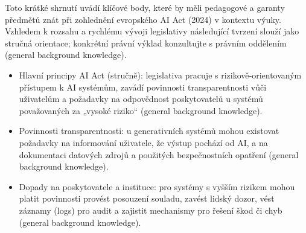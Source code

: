 Toto krátké shrnutí uvádí klíčové body, které by měli pedagogové a garanty předmětů znát při zohlednění evropského AI Act (2024) v kontextu výuky. Vzhledem k rozsahu a rychlému vývoji legislativy následující tvrzení slouží jako stručná orientace; konkrétní právní výklad konzultujte s právním oddělením (general background knowledge).

\begin{itemize}
  \item Hlavní principy AI Act (stručně): legislativa pracuje s rizikově‑orientovaným přístupem k AI systémům, zavádí povinnosti transparentnosti vůči uživatelům a požadavky na odpovědnost poskytovatelů u systémů považovaných za „vysoké riziko“ (general background knowledge).
  \item Povinnosti transparentnosti: u generativních systémů mohou existovat požadavky na informování uživatele, že výstup pochází od AI, a na dokumentaci datových zdrojů a použitých bezpečnostních opatření (general background knowledge).
  \item Dopady na poskytovatele a instituce: pro systémy s vyšším rizikem mohou platit povinnosti provést posouzení souladu, zavést lidský dozor, vést záznamy (logs) pro audit a zajistit mechanismy pro řešení škod či chyb (general background knowledge).
\end{itemize}

